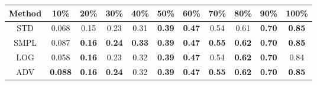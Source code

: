 \documentclass{standalone}
\begin{document}
\begin{tabular}{c|cccccccccc}
      \toprule
      Method & 10\% & 20\% & 30\% & 40\% & 50\% & 60\% & 70\% & 80\% & 90\% & 100\% \\
      \midrule
STD & 0.068 & 0.15 & 0.23 & 0.31 & \textbf{0.39} & \textbf{0.47} & 0.54 & 0.61 & \textbf{0.70} & \textbf{0.85}\\
SMPL & 0.087 & \textbf{0.16} & \textbf{0.24} & \textbf{0.33} & \textbf{0.39} & \textbf{0.47} & \textbf{0.55} & \textbf{0.62} & \textbf{0.70} & \textbf{0.85}\\
LOG & 0.058 & \textbf{0.16} & 0.23 & 0.32 & \textbf{0.39} & \textbf{0.47} & 0.54 & \textbf{0.62} & \textbf{0.70} & 0.84\\
ADV & \textbf{0.088} & \textbf{0.16} & \textbf{0.24} & 0.32 & \textbf{0.39} & \textbf{0.47} & \textbf{0.55} & \textbf{0.62} & \textbf{0.70} & \textbf{0.85}\\
  \bottomrule
\end{tabular}
\end{document}
